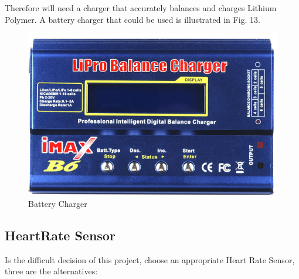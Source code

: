 \documentclass[10pt,journal,compsoc]{IEEEtran}
\begin{document}
%

Therefore will need a charger that accurately balances and charges Lithium Polymer. A battery charger that could be used is illustrated in Fig. 13.

\begin{figure}[h]
  \centering
  \captionsetup{justification=centering}
  \includegraphics[scale=.35]{es12}
  \caption{Battery Charger}
  \label{fig:fig13}
\end{figure}

%

\subsection{HeartRate Sensor}

Is the difficult decision of this project, choose an appropriate Heart Rate Sensor, three are the alternatives:
\end{document}
